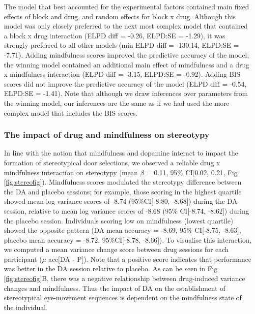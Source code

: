 \documentclass{article}
\begin{document}
The model that best accounted for the experimental factors contained
main fixed effects of block and drug, and random effects for block x
drug. Although this model was only closely preferred to the next most
complex model that contained a block x drug interaction (ELPD diff =
-0.26, ELPD:SE = -1.29), it was strongly preferred to all other models
(min ELPD diff = -130.14, ELPD:SE = -7.71). Adding mindfulness scores
improved the predictive accuracy of the model; the winning model
contained an additional main effect of mindfulness and a drug x
mindfulness interaction (ELPD diff = -3.15, ELPD:SE = -0.92). Adding BIS
scores did not improve the predictive accuracy of the model (ELPD diff =
-0.54, ELPD:SE = -1.41). Note that although we draw inferences over
parameters from the winning model, our inferences are the same as if we
had used the more complex model that includes the BIS scores.

\hypertarget{the-impact-of-drug-and-mindfulness-on-stereotypy}{%
\subsubsection{The impact of drug and mindfulness on
stereotypy}\label{the-impact-of-drug-and-mindfulness-on-stereotypy}}

In line with the notion that mindfulness and dopamine interact to impact
the formation of stereotypical door selections, we observed a reliable
drug x mindfulness interaction on stereotypy (mean \(\beta\) = 0.11,
95\% CI{[}0.02, 0.21, Fig \ref{fig:stereofig}). Mindfulness scores
modulated the stereotypy difference between the DA and placebo sessions;
for example, those scoring in the highest quartile showed mean log
variance scores of -8.74 (95\%CI{[}-8.80, -8.68{]}) during the DA
session, relative to mean log variance scores of -8.68 (95\% CI{[}-8.74,
-8.62{]}) during the placebo session. Individuals scoring low on
mindfulness (lowest quartile) showed the opposite pattern (DA mean
accuracy = -8.69, 95\% CI{[}-8.75, -8.63{]}, placebo mean accuracy =
-8.72, 95\%CI{[}-8.78, -8.66{]}). To visualise this interaction, we
computed a mean variance change score between drug sessions for each
participant (\(\mu\) acc{[}DA - P{]}). Note that a positive score
indicates that performance was better in the DA session relative to
placebo. As can be seen in Fig \ref{fig:stereofig}B, there was a
negative relationship between drug-induced variance changes and
mindfulness. Thus the impact of DA on the establishment of stereotypical
eye-movement sequences is dependent on the mindfulness state of the
individual.
\end{document}
